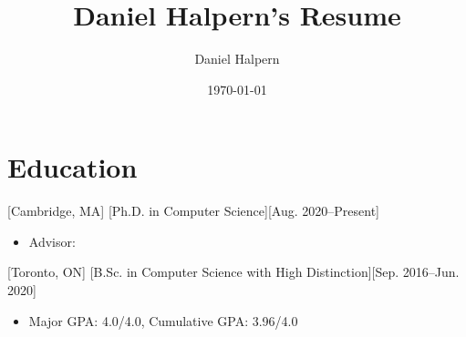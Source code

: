 \documentclass{article}
\title{Daniel Halpern's Resume}
\author{Daniel Halpern}
\date{\today}
\newcommand{\link}[2]{\iftoggle{uselinks}{\href{#1}{#2}}{#2}\xspace}
\begin{document}

    \makecvtitle %

    \section{Education}

    [Cambridge, MA]
    [Ph.D. in Computer Science][Aug. 2020--Present]
    \begin{itemize}
        \item Advisor: \link{http://procaccia.info}{Ariel Procaccia}
    \end{itemize}

    [Toronto, ON]
    [B.Sc. in Computer Science with High Distinction][Sep. 2016--Jun. 2020]
    \begin{itemize}
        \item Major GPA: 4.0/4.0, Cumulative GPA: 3.96/4.0
    \end{itemize}
\end{document}
